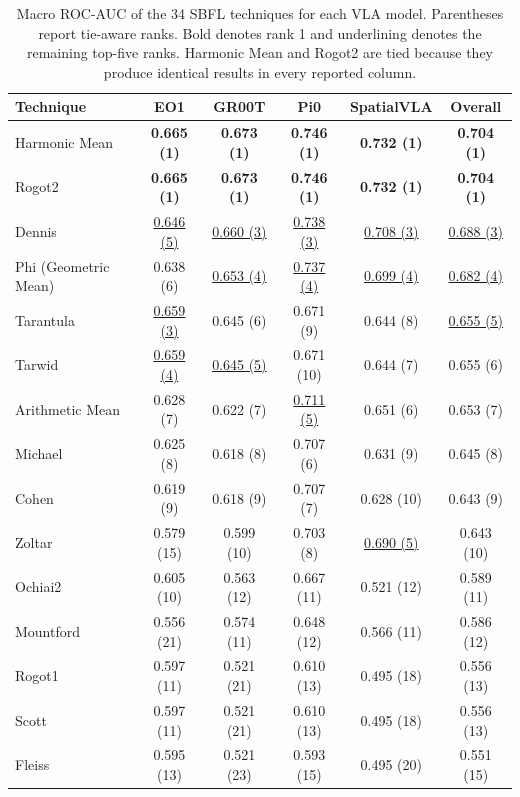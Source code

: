 \begin{table}[t]
\centering
\caption{Macro ROC-AUC of the 34 SBFL techniques for each VLA model. Parentheses report tie-aware ranks. Bold denotes rank 1 and underlining denotes the remaining top-five ranks. Harmonic Mean and Rogot2 are tied because they produce identical results in every reported column.}
\label{tab:rq1-cross-vla}
{\scriptsize
\setlength{\tabcolsep}{4pt}
\renewcommand{\arraystretch}{0.96}
\begin{tabular}{lccccc}
\toprule
Technique & EO1 & GR00T & Pi0 & SpatialVLA & Overall \\
\midrule
Harmonic Mean & \textbf{0.665 (1)} & \textbf{0.673 (1)} & \textbf{0.746 (1)} & \textbf{0.732 (1)} & \textbf{0.704 (1)} \\
Rogot2 & \textbf{0.665 (1)} & \textbf{0.673 (1)} & \textbf{0.746 (1)} & \textbf{0.732 (1)} & \textbf{0.704 (1)} \\
Dennis & \underline{0.646 (5)} & \underline{0.660 (3)} & \underline{0.738 (3)} & \underline{0.708 (3)} & \underline{0.688 (3)} \\
Phi (Geometric Mean) & 0.638 (6) & \underline{0.653 (4)} & \underline{0.737 (4)} & \underline{0.699 (4)} & \underline{0.682 (4)} \\
Tarantula & \underline{0.659 (3)} & 0.645 (6) & 0.671 (9) & 0.644 (8) & \underline{0.655 (5)} \\
Tarwid & \underline{0.659 (4)} & \underline{0.645 (5)} & 0.671 (10) & 0.644 (7) & 0.655 (6) \\
Arithmetic Mean & 0.628 (7) & 0.622 (7) & \underline{0.711 (5)} & 0.651 (6) & 0.653 (7) \\
Michael & 0.625 (8) & 0.618 (8) & 0.707 (6) & 0.631 (9) & 0.645 (8) \\
Cohen & 0.619 (9) & 0.618 (9) & 0.707 (7) & 0.628 (10) & 0.643 (9) \\
Zoltar & 0.579 (15) & 0.599 (10) & 0.703 (8) & \underline{0.690 (5)} & 0.643 (10) \\
Ochiai2 & 0.605 (10) & 0.563 (12) & 0.667 (11) & 0.521 (12) & 0.589 (11) \\
Mountford & 0.556 (21) & 0.574 (11) & 0.648 (12) & 0.566 (11) & 0.586 (12) \\
Rogot1 & 0.597 (11) & 0.521 (21) & 0.610 (13) & 0.495 (18) & 0.556 (13) \\
Scott & 0.597 (11) & 0.521 (21) & 0.610 (13) & 0.495 (18) & 0.556 (13) \\
Fleiss & 0.595 (13) & 0.521 (23) & 0.593 (15) & 0.495 (20) & 0.551 (15) \\

\end{tabular}}
\end{table}
